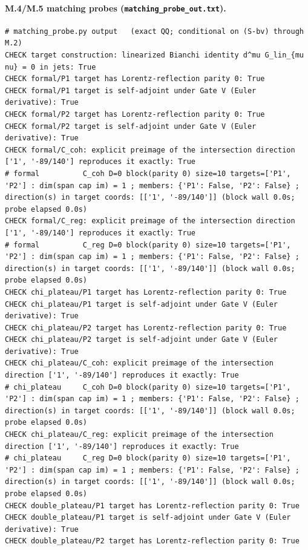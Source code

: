 \documentclass{article}
\theoremstyle{remark}
\begin{document}
\paragraph{M.4/M.5 matching probes (\texttt{matching\_probe\_out.txt}).}
\begin{lstlisting}
# matching_probe.py output   (exact QQ; conditional on (S-bv) through M.2)
CHECK target construction: linearized Bianchi identity d^mu G_lin_{mu nu} = 0 in jets: True
CHECK formal/P1 target has Lorentz-reflection parity 0: True
CHECK formal/P1 target is self-adjoint under Gate V (Euler derivative): True
CHECK formal/P2 target has Lorentz-reflection parity 0: True
CHECK formal/P2 target is self-adjoint under Gate V (Euler derivative): True
CHECK formal/C_coh: explicit preimage of the intersection direction ['1', '-89/140'] reproduces it exactly: True
# formal          C_coh D=0 block(parity 0) size=10 targets=['P1', 'P2'] : dim(span cap im) = 1 ; members: {'P1': False, 'P2': False} ; direction(s) in target coords: [['1', '-89/140']] (block wall 0.0s; probe elapsed 0.0s)
CHECK formal/C_reg: explicit preimage of the intersection direction ['1', '-89/140'] reproduces it exactly: True
# formal          C_reg D=0 block(parity 0) size=10 targets=['P1', 'P2'] : dim(span cap im) = 1 ; members: {'P1': False, 'P2': False} ; direction(s) in target coords: [['1', '-89/140']] (block wall 0.0s; probe elapsed 0.0s)
CHECK chi_plateau/P1 target has Lorentz-reflection parity 0: True
CHECK chi_plateau/P1 target is self-adjoint under Gate V (Euler derivative): True
CHECK chi_plateau/P2 target has Lorentz-reflection parity 0: True
CHECK chi_plateau/P2 target is self-adjoint under Gate V (Euler derivative): True
CHECK chi_plateau/C_coh: explicit preimage of the intersection direction ['1', '-89/140'] reproduces it exactly: True
# chi_plateau     C_coh D=0 block(parity 0) size=10 targets=['P1', 'P2'] : dim(span cap im) = 1 ; members: {'P1': False, 'P2': False} ; direction(s) in target coords: [['1', '-89/140']] (block wall 0.0s; probe elapsed 0.0s)
CHECK chi_plateau/C_reg: explicit preimage of the intersection direction ['1', '-89/140'] reproduces it exactly: True
# chi_plateau     C_reg D=0 block(parity 0) size=10 targets=['P1', 'P2'] : dim(span cap im) = 1 ; members: {'P1': False, 'P2': False} ; direction(s) in target coords: [['1', '-89/140']] (block wall 0.0s; probe elapsed 0.0s)
CHECK double_plateau/P1 target has Lorentz-reflection parity 0: True
CHECK double_plateau/P1 target is self-adjoint under Gate V (Euler derivative): True
CHECK double_plateau/P2 target has Lorentz-reflection parity 0: True

\end{lstlisting}
\end{document}
